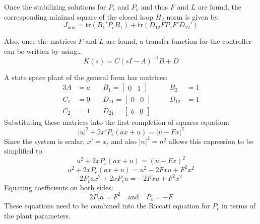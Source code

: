 Once the stabilizing solutions for $P_{c}$ and $P_{e}$ and thus $F$ and $L$ are found, the corresponding minimal square of the closed loop $H_{2}$ norm is given by:
\begin{equation*}
  J_{\min}=\text{tr}({B_{1}}'P_{c}B_{1})+\text{tr}(D_{12}FP_{e}F'{D_{12}}')
\end{equation*}

Also, once the matrices $F$ and $L$ are found, a transfer function for the controller can be written by using\dots
\begin{equation*}
  K(s)=C(sI-A)^{-1}B+D
\end{equation*}

\begin{example}
  A state space plant of the general form has matrices:
  \begin{alignat*}{3}
    A&=a \quad &B_{1}=
    \begin{bmatrix}
      0 & 1
    \end{bmatrix} && \quad B_{2}&=1 \\
    C_{1}&=0 \quad &D_{11}=
    \begin{bmatrix}
      0 & 0
    \end{bmatrix} && \quad D_{12}&=1 \\
    C_{2}&=1 \quad &D_{21}=
    \begin{bmatrix}
      b & 0
    \end{bmatrix} &&
  \end{alignat*}
  Substituting these matrices into the first completion of squares equation:
  \begin{equation*}
    |u|^{2}+2x'P_{c}(ax+u)=|u-Fx|^{2}
  \end{equation*}
  Since the system is scalar, $x'=x$, and also $|n|^{2}=n^{2}$ allows this expression to be simplified to:
  \begin{equation*}
    u^{2}+2xP_{c}(ax+u)=(u-Fx)^{2}
  \end{equation*}
  \begin{equation*}
    u^{2}+2xP_{c}(ax+u)=u^{2}-2Fxu+F^{2}x^{2}
  \end{equation*}
  \begin{equation*}
    2P_{c}ax^{2}+2xP_{c}u=-2Fxu+F^{2}x^{2}
  \end{equation*}
  Equating coefficients on both sides:
  \begin{equation*}
    2P_{c}a=F^{2}
    \quad \text{and} \quad
    P_{c}=-F
  \end{equation*}
  These equations need to be combined into the Riccati equation for $P_{c}$ in terms of the plant parameters.

\end{example}
